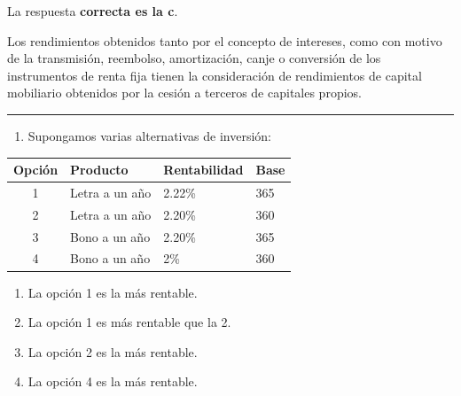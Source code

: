 \documentclass[
  letterpaper,
  DIV=11,
  numbers=noendperiod]{scrreprt}
\providecommand{\tightlist}{%
  \setlength{\itemsep}{0pt}\setlength{\parskip}{0pt}}\usepackage{longtable,booktabs,array}
\begin{document}
\begin{tcolorbox}[enhanced jigsaw, left=2mm, opacityback=0, colback=white, breakable, arc=.35mm, bottomrule=.15mm, rightrule=.15mm, toprule=.15mm, leftrule=.75mm, colframe=quarto-callout-tip-color-frame]
\begin{minipage}[t]{5.5mm}
\textcolor{quarto-callout-tip-color}{\faLightbulb}
\end{minipage}%
\begin{minipage}[t]{\textwidth - 5.5mm}

La respuesta \textbf{correcta es la c}.

Los rendimientos obtenidos tanto por el concepto de intereses, como con
motivo de la transmisión, reembolso, amortización, canje o conversión de
los instrumentos de renta fija tienen la consideración de rendimientos
de capital mobiliario obtenidos por la cesión a terceros de capitales
propios.

\end{minipage}%
\end{tcolorbox}

\begin{center}\rule{0.5\linewidth}{0.5pt}\end{center}

\begin{enumerate}
\def\labelenumi{\arabic{enumi}.}
\setcounter{enumi}{93}
\tightlist
\item
  Supongamos varias alternativas de inversión:
\end{enumerate}

\begin{longtable}[]{@{}clll@{}}
\toprule()
Opción & Producto & Rentabilidad & Base \\
\midrule()
\endhead
1 & Letra a un año & 2.22\% & 365 \\
2 & Letra a un año & 2.20\% & 360 \\
3 & Bono a un año & 2.20\% & 365 \\
4 & Bono a un año & 2\% & 360 \\
\bottomrule()
\end{longtable}

\begin{enumerate}
\def\labelenumi{\alph{enumi})}
\item
  La opción 1 es la más rentable.
\item
  La opción 1 es más rentable que la 2.
\item
  La opción 2 es la más rentable.
\item
  La opción 4 es la más rentable.
\end{enumerate}
\end{document}
